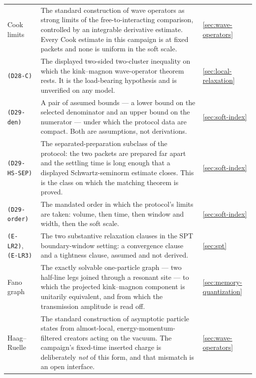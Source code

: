 {\begin{longtable}{@{}p{}p{}p{}@{}}
Cook limits & The standard construction of wave operators as strong limits of
the free-to-interacting comparison, controlled by an integrable derivative
estimate. Every Cook estimate in this campaign is at fixed packets and none is
uniform in the soft scale. & \cref{sec:wave-operators}\\

\texttt{(D28-C)} & The displayed two-sided two-cluster inequality on which the
kink--magnon wave-operator theorem rests. It is the load-bearing hypothesis
and is unverified on any model. & \cref{sec:local-relaxation}\\

\texttt{(D29-den)} & A pair of assumed bounds --- a lower bound on the
selected denominator and an upper bound on the numerator --- under which the
protocol data are compact. Both are assumptions, not derivations. & \cref{sec:soft-index}\\

\texttt{(D29-HS-SEP)} & The separated-preparation subclass of the protocol: the
two packets are prepared far apart and the settling time is long enough that a
displayed Schwartz-seminorm estimate closes. This is the class on which the
matching theorem is proved. & \cref{sec:soft-index}\\

\texttt{(D29-order)} & The mandated order in which the protocol's limits are
taken: volume, then time, then window and width, then the soft scale. & \cref{sec:soft-index}\\

\texttt{(E-LR2)}, \texttt{(E-LR3)} & The two substantive relaxation clauses in
the SPT boundary-window setting: a convergence clause and a tightness clause,
assumed and not derived. & \cref{sec:spt}\\

Fano graph & The exactly solvable one-particle graph --- two half-line legs
joined through a resonant site --- to which the projected kink--magnon
component is unitarily equivalent, and from which the transmission amplitude
is read off. & \cref{sec:memory-quantization}\\

Haag--Ruelle & The standard construction of asymptotic particle states from
almost-local, energy-momentum-filtered creators acting on the vacuum. The
campaign's fixed-time inserted charge is deliberately \emph{not} of this form,
and that mismatch is an open interface. & \cref{sec:wave-operators}\\


\end{longtable}}
